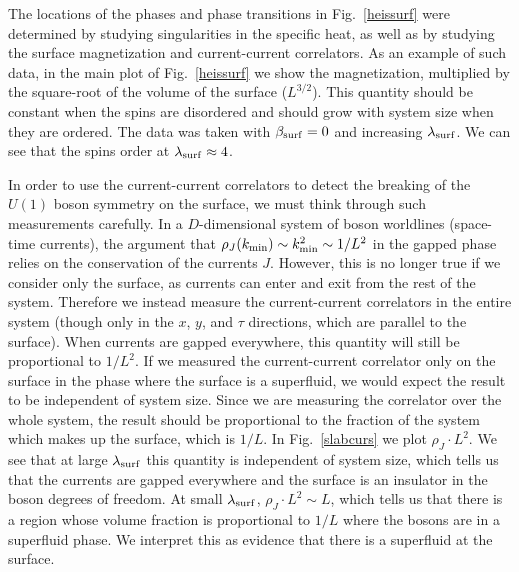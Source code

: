 \documentclass[prb,twocolumn]{revtex4-1}
\begin{document}
The locations of the phases and phase transitions in Fig.~\ref{heissurf} were determined by studying singularities in the specific heat, as well as by studying the surface magnetization and current-current correlators. As an example of such data, in the main plot of Fig.~\ref{heissurf} we show the magnetization, multiplied by the square-root of the volume of the surface ($L^{3/2}$). This quantity should be constant when the spins are disordered and should grow with system size when they are ordered. The data was taken with $\beta_{\rm surf}=0$ and increasing $\lambda_{\rm surf}$. We can see that the spins order at $\lambda_{\rm surf} \approx 4$. 

In order to use the current-current correlators to detect the breaking of the $U(1)$ boson symmetry on the surface, we must think through such measurements carefully.  In a $D$-dimensional system of boson worldlines (space-time currents), the argument that $\rho_J(k_{\rm min}) \sim k_{\rm min}^2 \sim 1/L^2$ in the gapped phase relies on the conservation of the currents $J$.  However, this is no longer true if we consider only the surface, as currents can enter and exit from the rest of the system.  
Therefore we instead measure the current-current correlators in the entire system (though only in the $x$, $y$, and $\tau$ directions, which are parallel to the surface). When currents are gapped everywhere, this quantity will still be proportional to $1/L^2$. 
If we measured the current-current correlator only on the surface in the phase where the surface is a superfluid, we would expect the result to be independent of system size. Since we are measuring the correlator over the whole system, the result should be proportional to the fraction of the system which makes up the surface, which is $1/L$.
In Fig.~\ref{slabcurs} we plot $\rho_J \cdot L^2$. We see that at large $\lambda_{\rm surf}$ this quantity is independent of system size, which tells us that the currents are gapped everywhere and the surface is an insulator in the boson degrees of freedom. At small $\lambda_{\rm surf}$, $\rho_J\cdot L^2 \sim L$, which tells us that there is a region whose volume fraction is proportional to $1/L$ where the bosons are in a superfluid phase. We interpret this as evidence that there is a superfluid at the surface.
\end{document}
